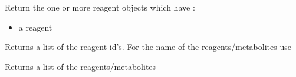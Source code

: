 \documentclass[letterpaper,10pt,english]{sphinxmanual}
\begin{document}
\begin{fulllineitems}
\begin{fulllineitems}
\begin{itemize}
\end{itemize}

\end{fulllineitems}


\begin{fulllineitems}
\label{\detokenize{modules_doc:cbmpy.CBModel.Reaction.getReagent}}
\pysigstartsignatures
{}
\pysigstopsignatures
\sphinxAtStartPar
Return the one or more reagent objects which have :
\begin{itemize}
\item {} 
\sphinxAtStartPar
{} a reagent 

\end{itemize}

\end{fulllineitems}


\begin{fulllineitems}
\label{\detokenize{modules_doc:cbmpy.CBModel.Reaction.getReagentObjIds}}
\pysigstartsignatures
{}
\pysigstopsignatures
\sphinxAtStartPar
Returns a list of the reagent id’s. For the name of the reagents/metabolites use 

\end{fulllineitems}


\begin{fulllineitems}
\label{\detokenize{modules_doc:cbmpy.CBModel.Reaction.getReagentRefs}}
\pysigstartsignatures
{}
\pysigstopsignatures
\sphinxAtStartPar
Returns a list of the reagents/metabolites

\end{fulllineitems}



\end{fulllineitems}
\end{document}
